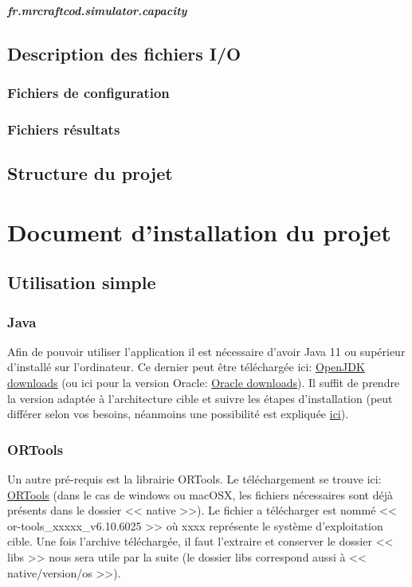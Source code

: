 \documentclass[final]{polytech/polytech}
\begin{document}
			\paragraph{fr.mrcraftcod.simulator.capacity}
				
		
	\section{Description des fichiers I/O}
		\subsection{Fichiers de configuration}
		\subsection{Fichiers résultats}
	\section{Structure du projet}
	
\chapter{Document d'installation du projet}
	\section{Utilisation simple}
		\subsection{Java\label{sec:install:java}}
			Afin de pouvoir utiliser l'application il est nécessaire d'avoir Java 11 ou supérieur d'installé sur l'ordinateur.
			Ce dernier peut être téléchargée ici: \href{https://jdk.java.net/}{OpenJDK downloads} (ou ici pour la version Oracle: \href{https://www.oracle.com/technetwork/java/javase/downloads/index.html}{Oracle downloads}).
			Il suffit de prendre la version adaptée à l'architecture cible et suivre les étapes d'installation (peut différer selon vos besoins, néanmoins une possibilité est expliquée \href{https://stackoverflow.com/a/52531093/3281185}{ici}).

		\subsection{ORTools}
			Un autre pré-requis est la librairie ORTools.
			Le téléchargement se trouve ici: \href{https://github.com/google/or-tools/releases/tag/v6.10}{ORTools} (dans le cas de windows ou macOSX, les fichiers nécessaires sont déjà présents dans le dossier << native >>).
			Le fichier a télécharger est nommé << or-tools\_xxxxx\_v6.10.6025 >> où xxxx représente le système d'exploitation cible.
			Une fois l'archive téléchargée, il faut l'extraire et conserver le dossier << libs >> nous sera utile par la suite (le dossier libs correspond aussi à << native/version/os >>).
\end{document}
